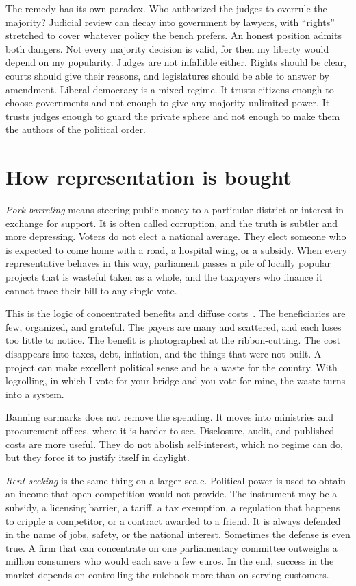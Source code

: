 \documentclass[12pt,a4paper]{book}
\begin{document}
The remedy has its own paradox. Who authorized the judges to overrule the majority? Judicial review can decay into government by lawyers, with ``rights'' stretched to cover whatever policy the bench prefers. An honest position admits both dangers. Not every majority decision is valid, for then my liberty would depend on my popularity. Judges are not infallible either. Rights should be clear, courts should give their reasons, and legislatures should be able to answer by amendment. Liberal democracy is a mixed regime. It trusts citizens enough to choose governments and not enough to give any majority unlimited power. It trusts judges enough to guard the private sphere and not enough to make them the authors of the political order.

\section{How representation is bought}

\emph{Pork barreling} means steering public money to a particular district or interest in exchange for support. It is often called corruption, and the truth is subtler and more depressing. Voters do not elect a national average. They elect someone who is expected to come home with a road, a hospital wing, or a subsidy. When every representative behaves in this way, parliament passes a pile of locally popular projects that is wasteful taken as a whole, and the taxpayers who finance it cannot trace their bill to any single vote.

This is the logic of concentrated benefits and diffuse costs~\cite{Olson1965,BuchananTullock1962}. The beneficiaries are few, organized, and grateful. The payers are many and scattered, and each loses too little to notice. The benefit is photographed at the ribbon-cutting. The cost disappears into taxes, debt, inflation, and the things that were not built. A project can make excellent political sense and be a waste for the country. With logrolling, in which I vote for your bridge and you vote for mine, the waste turns into a system.

Banning earmarks does not remove the spending. It moves into ministries and procurement offices, where it is harder to see. Disclosure, audit, and published costs are more useful. They do not abolish self-interest, which no regime can do, but they force it to justify itself in daylight.

\emph{Rent-seeking} is the same thing on a larger scale. Political power is used to obtain an income that open competition would not provide. The instrument may be a subsidy, a licensing barrier, a tariff, a tax exemption, a regulation that happens to cripple a competitor, or a contract awarded to a friend. It is always defended in the name of jobs, safety, or the national interest. Sometimes the defense is even true. A firm that can concentrate on one parliamentary committee outweighs a million consumers who would each save a few euros. In the end, success in the market depends on controlling the rulebook more than on serving customers.
\end{document}
